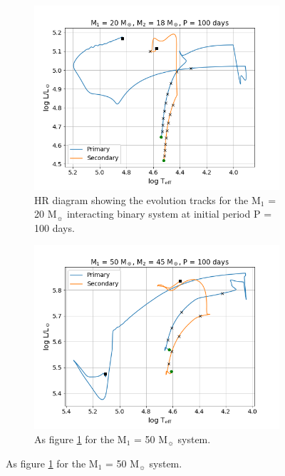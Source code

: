 \begin{figure}
    \begin{subfigure}{\columnwidth}
        \includegraphics[width=\columnwidth]{figures/results1/fig_HR_M20_P100.png}
        \captionsetup{width=.9\columnwidth}
        \caption{HR diagram showing the evolution tracks for the M$_1$ = 20 M$_{\sun}$ interacting binary system at initial period P = 100 days.}
        \label{subfig:20Msol_HR_Bin}
    \end{subfigure}
    \hfill
    \begin{subfigure}{\columnwidth}
        \includegraphics[width=\columnwidth]{figures/results1/fig_HR_M50_P100.png}
        \captionsetup{width=.9\columnwidth}
        \caption{As figure \ref{subfig:20Msol_HR_Bin} for the M$_1$ = 50 M$_{\sun}$ system. \newline}
        \label{subfig:50Msol_HR_Bin}
    \end{subfigure}
    

\end{figure}

